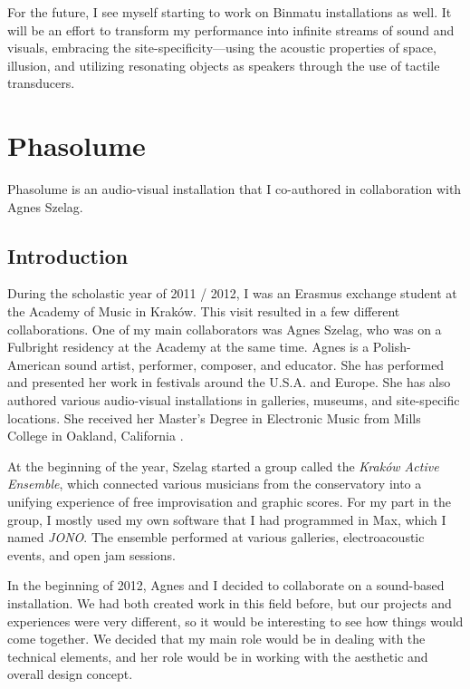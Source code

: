 \documentclass[12pt,a4paper,oneside]{report}
\begin{document}
For the future, I see myself starting to work on Binmatu installations as well. It will be an effort to transform my performance into infinite streams of sound and visuals, embracing the site-specificity---using the acoustic properties of space, illusion, and utilizing resonating objects as speakers through the use of tactile transducers.


\section{Phasolume} Phasolume is an audio-visual installation that I co-authored in collaboration with Agnes Szelag.

\subsection{Introduction} 

During the scholastic year of 2011 / 2012, I was an Erasmus exchange student at the Academy of Music in Kraków. This visit resulted in a few different collaborations. One of my main collaborators was Agnes Szelag, who was on a Fulbright residency at the Academy at the same time.  Agnes is a Polish-American sound artist, performer, composer, and educator. She has performed and presented her work in festivals around the U.S.A. and Europe. She has also authored various audio-visual installations in galleries, museums, and site-specific locations. She received her Master’s Degree in Electronic Music from Mills College in Oakland, California \cite{szelag}.

At the beginning of the year, Szelag started a group called the \emph{Kraków Active Ensemble}, which connected various musicians from the conservatory into a unifying experience of free improvisation and graphic scores. For my part in the group, I mostly used my own software that I had programmed in Max, which I named \emph{JONO}. The ensemble performed at various galleries, electroacoustic events, and open jam sessions.

In the beginning of 2012, Agnes and I decided to collaborate on a sound-based installation. We had both created work in this field before, but our projects and experiences were very different, so it would be interesting to see how things would come together.  We decided that my main role would be in dealing with the technical elements, and her role would be in working with the aesthetic and overall design concept.
\end{document}
